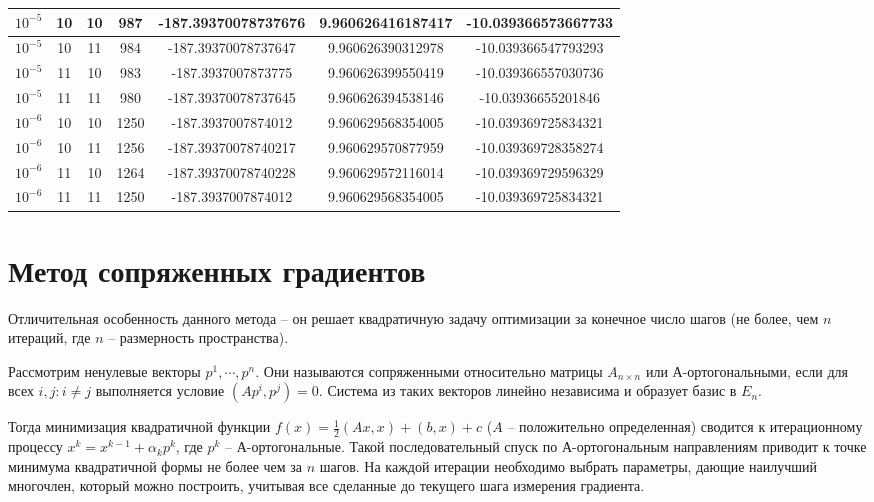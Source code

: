 \documentclass[12pt]{article}
\begin{document}
\begin{table}[h]
\begin{tabular}{|c|c|c|c|c|c|c|}
$10^{-5}$ & 10 & 10 & 987  & -187.39370078737676 & 9.960626416187417 & -10.039366573667733 \\ \hline
$10^{-5}$ & 10 & 11 & 984  & -187.39370078737647 & 9.960626390312978 & -10.039366547793293 \\ \hline
$10^{-5}$ & 11 & 10 & 983  & -187.3937007873775  & 9.960626399550419 & -10.039366557030736 \\ \hline
$10^{-5}$ & 11 & 11 & 980  & -187.39370078737645 & 9.960626394538146 & -10.03936655201846  \\ \hline
$10^{-6}$ & 10 & 10 & 1250 & -187.3937007874012  & 9.960629568354005 & -10.039369725834321 \\ \hline
$10^{-6}$ & 10 & 11 & 1256 & -187.39370078740217 & 9.960629570877959 & -10.039369728358274 \\ \hline
$10^{-6}$ & 11 & 10 & 1264 & -187.39370078740228 & 9.960629572116014 & -10.039369729596329 \\ \hline
$10^{-6}$ & 11 & 11 & 1250 & -187.3937007874012  & 9.960629568354005 & -10.039369725834321 \\ \hline
\end{tabular}
\end{table}

\newpage
\section{Метод сопряженных градиентов}

Отличительная особенность данного метода -- он решает квадратичную задачу оптимизации за конечное число шагов (не более, чем $n$ итераций, где $n$ -- размерность пространства).

Рассмотрим ненулевые векторы $p^1, \cdots, p^n$. Они называются сопряженными относительно матрицы $A_{n \times n}$ или А-ортогональными, если для всех $i, j: i \neq j$ выполняется условие $\left(Ap^i, p^j \right) = 0$. Система из таких векторов линейно независима и образует базис в $E_n$. 

Тогда минимизация квадратичной функции $f(x) = \frac{1}{2} \left(Ax, x \right) + \left(b, x \right) + c$ ($A$ -- положительно определенная) сводится к итерационному процессу $x^k=x^{k-1}+\alpha_k p^k$, где $p^k$ -- А-ортогональные. Такой последовательный спуск по А-ортогональным направлениям приводит к точке минимума квадратичной формы не более чем за $n$ шагов. На каждой итерации необходимо выбрать параметры, дающие наилучший многочлен, который можно построить, учитывая все сделанные до текущего шага измерения градиента.
\end{document}
